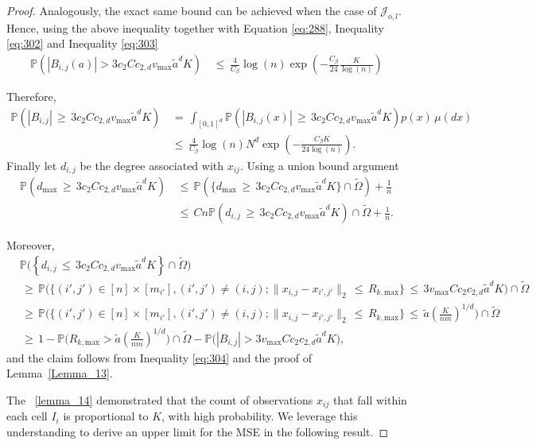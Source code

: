 \documentclass[twoside,11pt]{article}
\begin{document}
\begin{proof}
Analogously, the exact same bound can be achieved when the case of \( \mathcal{J}_{o,l} \). Hence, using the above inequality together with Equation \eqref{eq:288}, Inequality \eqref{eq:302} and Inequality \eqref{eq:303}
\begin{align}
    \mathbb{P}\left( |B_{i,j}(a)| > 3c_2Cc_{2,d}v_{\text{max}}{\tilde a}^dK \right) 
    &\,\leq\, \frac{4}{C_{\beta}} \log(n)\exp\left( -\frac{C_{\beta}}{24} \frac{K}{\log(n)} \right) \label{eq:306}
\end{align}

Therefore,
\begin{align}
\mathbb{P} \left( |B_{i,j}| \,\geq\, 3c_2Cc_{2,d}v_{\text{max}}{\tilde a}^dK \right) &\,=\, \int_{[0,1]^d} \mathbb{P} \left( |B_{i,j}(x)| \,\geq\, 3c_2Cc_{2,d}v_{\text{max}}{\tilde a}^dK \right) p(x) \, \mu(dx) \nonumber \\
&\,\leq\, \frac{4}{C_{\beta}} \log(n)N^d \exp\left(-\frac{C_{\beta} K}{24 \log(n)}\right). \label{eq:304}
\end{align}
Finally let \( d_{i,j} \) be the degree associated with \( x_{ij} \). Using a union bound argument
\begin{align}
\mathbb{P} \left( d_{\text{max}} \,\geq\, 3c_2Cc_{2,d}v_{\text{max}}{\tilde a}^dK \right) &\,\leq\, \mathbb{P} \left( \{ d_{\text{max}} \,\geq\, 3c_2Cc_{2,d}v_{\text{max}}{\tilde a}^dK \} \cap \tilde \Omega \right) + \frac{1}{n} \nonumber \\
&\,\leq\, Cn\mathbb{P} \left( d_{i,j} \,\geq\, 3c_2Cc_{2,d}v_{\text{max}}{\tilde a}^dK \right) \cap \tilde \Omega + \frac{1}{n}.
\end{align}
 





Moreover,
\begin{align}
    &\mathbb{P} \big( \left\{ d_{i,j} \,\leq\, 3c_2Cc_{2,d}v_{\text{max}}{\tilde a}^dK \right\}  \cap \tilde \Omega\big)  \nonumber \\
    &\,\geq\, \mathbb{P} \Bigg( \Big\{ (i',j') \in [n] \times [m_{i'}], (i',j') \neq (i,j) ; \|x_{i,j} - x_{i',j'}\|_2 \,\leq\, R_{k,\text{max}} \Big\} \,\leq\, 3v_{\text{max}}Cc_2c_{2,d}\tilde a^dK \Bigg) \cap \tilde \Omega \nonumber \\
    &\,\geq\, \mathbb{P} \Bigg( \Big\{ (i',j') \in [n] \times [m_{i'}], (i',j') \neq (i,j) ; \|x_{i,j} - x_{i',j'}\|_2 \,\leq\, R_{k,\text{max}} \Big\} \,\leq\, \tilde a \left(\frac{K}{nm}\right)^{1/d} \Bigg) \cap \tilde \Omega \nonumber \\
    &\,\geq\, 1 - \mathbb{P} \Bigg( R_{k,\text{max}} > \tilde a \left(\frac{K}{nm}\right)^{1/d} \Bigg) \cap \tilde \Omega - \mathbb{P} \Big( |B_{i,j}| > 3v_{\text{max}}Cc_2c_{2,d}\tilde a^dK \Big), \label{eq:lemma14_inequality}
\end{align}
and the claim follows from Inequality \eqref{eq:304} and the proof of Lemma~\ref{Lemma_13}.

The ~\ref{lemma_14} demonstrated that the count of observations \(x_{ij}\) that fall within each cell \(I_i\) is proportional to \(K\), with high probability. We leverage this understanding to derive an upper limit for the MSE in the following result. 
\end{proof}
\end{document}
